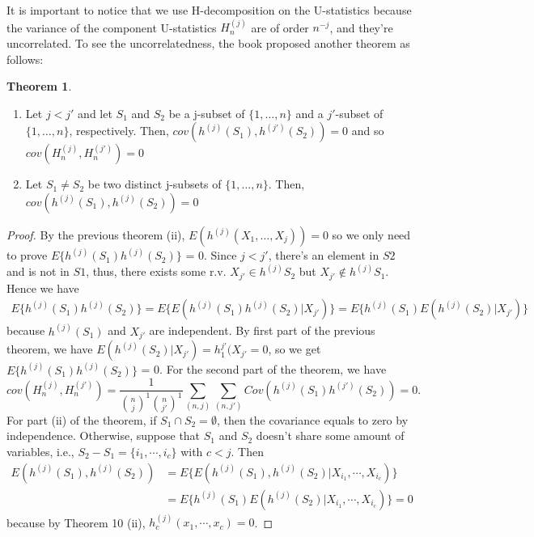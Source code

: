 \documentclass{article}
\theoremstyle{definition}
\newtheorem{theorem}{Theorem}
\numberwithin{Def}{section}
\begin{document}
    It is important to notice that we use H-decomposition on the U-statistics because the variance of the component U-statistics $H_n^{(j)}$ are of order $n^{-j}$, and they're uncorrelated. To see the uncorrelatedness, the book proposed another theorem as follows:
    
    \begin{theorem}
    \begin{enumerate} [label = (\roman*)]
        \item Let $j <j'$ and let $S_1$ and $S_2$ be a j-subset of $\{1, \dotsc, n\}$ and a $j'$-subset of $\{1, \dotsc, n\}$, respectively. Then, $cov(h^{(j)}(S_1), h^{(j')}(S_2)) = 0$ and so $cov(H_n^{(j)}, H_n^{(j')}) = 0$
        \item Let $S_1 \neq S_2$ be two distinct j-subsets of $\{1, \dotsc, n\}$. Then, $cov(h^{(j)}(S_1), h^{(j)}(S_2)) = 0$
    \end{enumerate}
    \end{theorem}
    
    
\begin{proof}
By the previous theorem (ii), $E(h^{(j)}(X_1, \dotsc, X_j)) = 0$ so we only need to prove $E\{h^{(j)}(S_1) h^{(j)}(S_2)\}$ = 0. Since $j < j'$, there's an element in $S2$ and is not in $S1$, thus, there exists some r.v. $X_{j'} \in h^{(j)}S_2$ but $X_{j'} \not \in h^{(j)}S_1$. Hence we have 
\begin{align*}
    E\{h^{(j)}(S_1)h^{(j)}(S_2)\} = E\{E(h^{(j)}(S_1)h^{(j)}(S_2) | X_{j'})\} = E\{h^{(j)}(S_1)E(h^{(j)}(S_2) | X_{j'})\}
\end{align*}
because $h^{(j)}(S_1)$ and $X_{j'}$ are independent. By first part of the previous theorem, we have  $E(h^{(j)}(S_2) | X_{j'}) = h_1^{j'}(X_{j'} = 0$, so we get $E\{h^{(j)}(S_1) h^{(j)}(S_2)\}$ = 0.
For the second part of the theorem, we have 
$$ cov(H_n^{(j)}, H_n^{(j')}) = \frac{1}{{n \choose j}^{1} {n \choose j'}^{1}} \sum_{(n,j)} \sum_{(n, j')} Cov(h^{(j)}(S_1)h^{(j')}(S_2) ) = 0.$$
For part (ii) of the theorem, if $S_1 \cap S_2 = \emptyset$, then the covariance equals to zero by independence. Otherwise, suppose that $S_1$ and $S_2$ doesn't share some amount of variables, i.e., $S_2 - S_1 = \{i_1, \cdots, i_c\}$ with $c < j$. Then \begin{align*}
    E(h^{(j)}(S_1), h^{(j)}(S_2)) &= E\{ E(h^{(j)}(S_1), h^{(j)}(S_2) | X_{i_1}, \cdots, X_{i_c})\} \\
    &= E\{ h^{(j)}(S_1) E( h^{(j)}(S_2) | X_{i_1}, \cdots, X_{i_c})\} = 0
\end{align*} 
because by Theorem 10 (ii), $h_c^{(j)} (x_1, \cdots, x_c) = 0$.
\end{proof}
\end{document}
